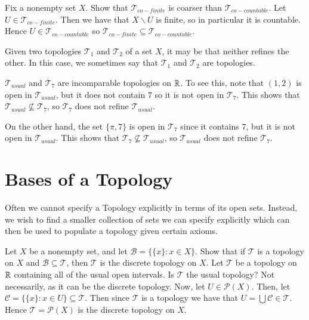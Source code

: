 \documentclass[12pt, a4paper, oneside, openright, titlepage]{book}
\begin{document}
\begin{xca}
    Fix a nonempty set $X$. Show that $\mathcal{T}_{co-finite}$ is coarser than $\mathcal{T}_{co-countable}$. Let $U \in \mathcal{T}_{co-finite}$. Then we have that $X\backslash U$ is finite, so in particular it is countable. Hence $U \in \mathcal{T}_{co-countable}$ so $\mathcal{T}_{co-finite} \subseteq \mathcal{T}_{co-countable}$.
\end{xca}

\begin{rmk}
    Given two topologies $\mathcal{T}_1$ and $\mathcal{T}_2$ of a set $X$, it may be that neither refines the other. In this case, we sometimes say that $\mathcal{T}_1$ and $\mathcal{T}_2$ are  topologies.
\end{rmk}

\begin{eg}
    $\mathcal{T}_{usual}$ and $\mathcal{T}_7$ are incomparable topologies on $\mathbb R$. To see this, note that $(1,2)$ is open in $\mathcal{T}_{usual}$, but it does not contain $7$ so it is not open in $\mathcal{T}_7$. This shows that $\mathcal{T}_{usual}\nsubseteq \mathcal{T}_7$, so $\mathcal{T}_7$ does not refine $\mathcal{T}_{usual}$. 

    On the other hand, the set $\{\pi,7\}$ is open in $\mathcal{T}_7$ since it contains $7$, but it is not open in $\mathcal{T}_{usual}$. This shows that $\mathcal{T}_7 \nsubseteq \mathcal{T}_{usual}$, so $\mathcal{T}_{usual}$ does not refine $\mathcal{T}_7$.
\end{eg}



\section{Bases of a Topology}

Often we cannot specify a Topology explicitly in terms of its open sets. Instead, we wish to find a smaller collection of sets we can specify explicitly which can then be used to populate a topology given certain axioms. 

\begin{xca}
    Let $X$ be a nonempty set, and let $\mathcal{B} = \{\{x\}:x \in X\}$. Show that if $\mathcal{T}$ is a topology on $X$ and $\mathcal{B}\subseteq \mathcal{T}$, then $\mathcal{T}$ is the discrete topology on $X$. Let $\mathcal{T}$ be a topology on $\mathbb R$ containing all of the usual open intervals. Is $\mathcal{T}$ the usual topology? Not necessarily, as it can be the discrete topology. Now, let $U \in \mathcal{P}(X)$. Then, let $\mathcal{C} = \{\{x\}:x\in U\} \subseteq \mathcal{T}$. Then since $\mathcal{T}$ is a topology we have that $U = \bigcup\mathcal{C}\in \mathcal{T}$. Hence $\mathcal{T} = \mathcal{P}(X)$ is the discrete topology on $X$.
\end{xca}
\end{document}
